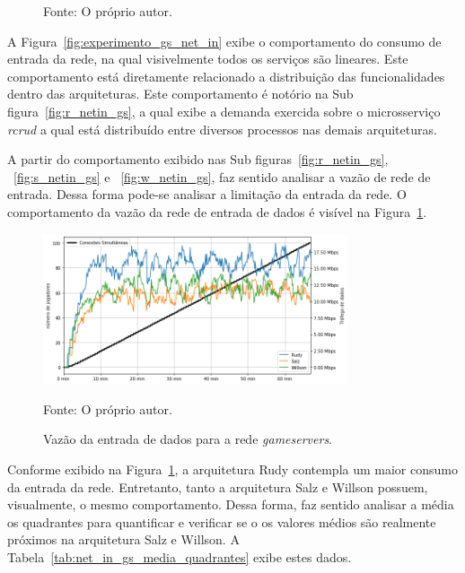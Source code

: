 \begin{figure}[htb!]
    Fonte: O próprio autor.
\end{figure}

A Figura~\ref{fig:experimento_gs_net_in} exibe o comportamento do consumo de entrada da rede, na qual visivelmente todos os serviços são lineares.
%
Este comportamento está diretamente relacionado a distribuição das funcionalidades dentro das arquiteturas.
%
Este comportamento é notório na Sub figura~\ref{fig:r_netin_gs}, a qual exibe a demanda exercida sobre o microsserviço \textit{rcrud} a qual está distribuído entre diversos processos nas demais arquiteturas.

A partir do comportamento exibido nas Sub figuras~\ref{fig:r_netin_gs}, ~\ref{fig:s_netin_gs} e ~\ref{fig:w_netin_gs}, faz sentido analisar a vazão de rede de entrada.
%
Dessa forma pode-se analisar a limitação da entrada da rede.
%
O comportamento da vazão da rede de entrada de dados é visível na Figura~\ref{fig:net_in_gs}.

\begin{figure}[htb!]
  \caption{Vazão da entrada de dados para a rede \textit{gameservers}.}
  \label{fig:net_in_gs}
  \includegraphics[width=0.8\textwidth]{figuras/analise/net_in_gs.png}
  \centering

  Fonte: O próprio autor.
\end{figure}

Conforme exibido na Figura~\ref{fig:net_in_gs}, a arquitetura Rudy contempla um maior consumo da entrada da rede.
%
Entretanto, tanto a arquitetura Salz e Willson possuem, visualmente, o mesmo comportamento.
%
Dessa forma, faz sentido analisar a média os quadrantes para quantificar e verificar se o os valores médios são realmente próximos na arquitetura Salz e Willson.
%
A Tabela~\ref{tab:net_in_gs_media_quadrantes} exibe estes dados.

